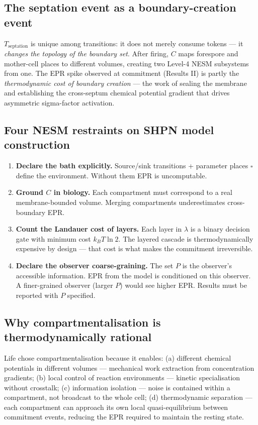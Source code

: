 \documentclass[11pt,a4paper]{article}
\begin{document}
\subsection*{The septation event as a boundary-creation event}

$T_{\text{septation}}$ is unique among transitions: it does not merely consume
tokens --- it \emph{changes the topology of the boundary set}.  After firing,
$C$ maps forespore and mother-cell places to different volumes, creating two
Level-4 NESM subsystems from one.  The EPR spike observed at commitment
(Results II) is partly the \emph{thermodynamic cost of boundary creation} ---
the work of sealing the membrane and establishing the cross-septum chemical
potential gradient that drives asymmetric sigma-factor activation.

\subsection*{Four NESM restraints on SHPN model construction}

\begin{enumerate}
  \item \textbf{Declare the bath explicitly.}  Source/sink transitions +
    parameter places $\square$ define the environment.  Without them EPR is
    uncomputable.
  \item \textbf{Ground $C$ in biology.}  Each compartment must correspond to
    a real membrane-bounded volume.  Merging compartments underestimates
    cross-boundary EPR.
  \item \textbf{Count the Landauer cost of layers.}  Each layer in $\lambda$
    is a binary decision gate with minimum cost $k_BT\ln2$.  The layered
    cascade is thermodynamically expensive by design --- that cost is what
    makes the commitment irreversible.
  \item \textbf{Declare the observer coarse-graining.}  The set $P$ is the
    observer's accessible information.  EPR from the model is conditioned on
    this observer.  A finer-grained observer (larger $P$) would see higher
    EPR.  Results must be reported with $P$ specified.
\end{enumerate}

\subsection*{Why compartmentalisation is thermodynamically rational}

Life chose compartmentalisation because it enables:
(a) different chemical potentials in different volumes --- mechanical work
extraction from concentration gradients;
(b) local control of reaction environments --- kinetic specialisation without
crosstalk;
(c) information isolation --- noise is contained within a compartment, not
broadcast to the whole cell;
(d) thermodynamic separation --- each compartment can approach its own local
quasi-equilibrium between commitment events, reducing the EPR required to
maintain the resting state.
\end{document}
